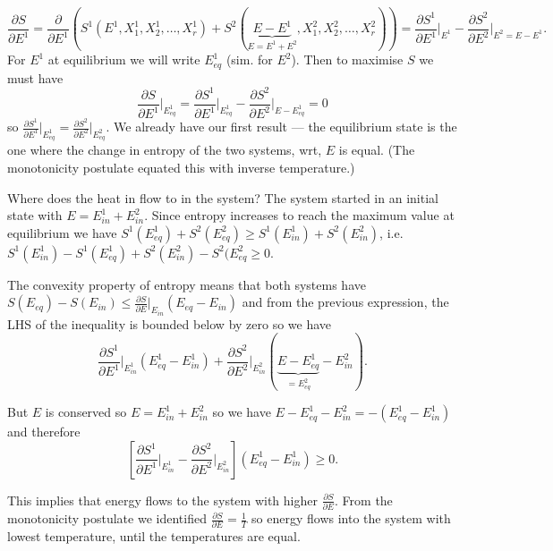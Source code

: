 $$\frac{\partial S}{\partial E^1} = \frac{\partial}{\partial E^1}\left(S^1(E^1,X_1^1,X_2^1,\ldots,X_r^1) + S^2(\underbrace{E-E^1}_{E=E^1+E^2},X_1^2,X_2^2,\ldots,X_r^2) \right) = \frac{\partial S^1}{\partial E^1}\bigg\vert_{E^1} -  \frac{\partial S^2}{\partial E^2}\bigg\vert_{E^2=E-E^1}.$$
For $E^1$ at equilibrium we will write $E^1_{eq}$ (sim. for $E^2$). Then to maximise $S$ we must have
$$\frac{\partial S}{\partial E^1}\bigg\vert_{E^1_{eq}} = \frac{\partial S^1}{\partial E^1}\bigg\vert_{E^1_{eq}} - \frac{\partial S^2}{\partial E^2}\bigg\vert_{E-E^1_{eq}}=0$$
so $\frac{\partial S^1}{\partial E^1}\vert_{E^1_{eq}} = \frac{\partial S^2}{\partial E^2}\vert_{E_{eq}^2}$. We already have our first result --- the equilibrium state is the one where the change in entropy of the two systems, wrt, $E$ is equal. (The  monotonicity postulate equated this with inverse temperature.)

Where does the heat in flow to in the system? The system started in an initial state with $E = E^1_{in}+E^2_{in}$. Since entropy increases to reach the maximum  value at equilibrium we have $S^1(E^1_{eq}) + S^2(E^2_{eq}) \geq S^1(E^1_{in}) + S^2(E^2_{in})$, i.e. $ S^1(E^1_{in}) - S^1(E^1_{eq})  +  S^2(E^2_{in}) - S^2(E^2_{eq}\geq 0$.

The convexity property of entropy means that both systems have $S(E_{eq})-S(E_{in})\leq \frac{\partial S}{\partial E}\vert_{E_{in}}(E_{eq}-E_{in})$ and from the previous expression, the LHS of the inequality is bounded below by zero so we have
$$\frac{\partial S^1}{\partial E^1}\bigg\vert_{E^1_{in}}(E_{eq}^1-E_{in}^1) + \frac{\partial S^2}{\partial E^2}\bigg\vert_{E^2_{in}}(\underbrace{E-E_{eq}^1}_{=E^2_{eq}}-E_{in}^2).$$

But $E$ is conserved so $E=E^1_{in}+E^2_{in}$ so we have $E-E^1_{eq}-E^2_{in} = -(E^1_{eq}-E^1_{in})$ and therefore
$$\left[\frac{\partial S^1}{\partial E^1}\bigg\vert_{E^1_{in}} - \frac{\partial S^2}{\partial E^2}\bigg\vert_{E^2_{in}}\right]\left(E^1_{eq}-E^1_{in}\right)\geq 0.$$

This implies that energy flows to the  system with higher $\frac{\partial S}{\partial E}$. From the monotonicity postulate we identified  $\frac{\partial S}{\partial E}= \frac{1}{T}$ so energy flows into the system with lowest temperature, until the temperatures are equal.

